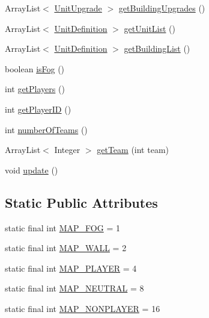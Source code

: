 \begin{DoxyCompactItemize}
ArrayList$<$ \hyperlink{classrts_1_1units_1_1_unit_upgrade}{UnitUpgrade} $>$ \hyperlink{classrts_1_1_game_state_a03f3ea2f7b2adb753694640ac39bc137}{getBuildingUpgrades} ()
\item 
ArrayList$<$ \hyperlink{classrts_1_1units_1_1_unit_definition}{UnitDefinition} $>$ \hyperlink{classrts_1_1_game_state_a747a9b452f6f523b111b5514688371dd}{getUnitList} ()
\item 
ArrayList$<$ \hyperlink{classrts_1_1units_1_1_unit_definition}{UnitDefinition} $>$ \hyperlink{classrts_1_1_game_state_a399feef9dac8584ae6e7480ecb573fb3}{getBuildingList} ()
\item 
boolean \hyperlink{classrts_1_1_game_state_ae7a0a1ef1bf0da51698ae5b9b572c4aa}{isFog} ()
\item 
int \hyperlink{classrts_1_1_game_state_afce4924a2e0cfc3dec27d36fe7f7eb57}{getPlayers} ()
\item 
int \hyperlink{classrts_1_1_game_state_a7ddc9862d7e3f2e0769f36bca696c094}{getPlayerID} ()
\item 
int \hyperlink{classrts_1_1_game_state_a81b78fd1308e71be6ba2c380280f3b69}{numberOfTeams} ()
\item 
ArrayList$<$ Integer $>$ \hyperlink{classrts_1_1_game_state_a0ffd9ba27b729ac65d48db250b73590d}{getTeam} (int team)
\item 
void \hyperlink{classrts_1_1_game_state_a24d74971777021954b07e350e931eb0d}{update} ()
\end{DoxyCompactItemize}
\subsection*{Static Public Attributes}
\begin{DoxyCompactItemize}
\item 
static final int \hyperlink{classrts_1_1_game_state_a530c303576be610b056108a2f8170aab}{MAP\_\-FOG} = 1
\item 
static final int \hyperlink{classrts_1_1_game_state_a439d94001bcac138eb445a25b389f3ed}{MAP\_\-WALL} = 2
\item 
static final int \hyperlink{classrts_1_1_game_state_a409da5852f5fbcb2bd2bdce1bfed6ecd}{MAP\_\-PLAYER} = 4
\item 
static final int \hyperlink{classrts_1_1_game_state_a91ca0cc55905241db9813413990ce41b}{MAP\_\-NEUTRAL} = 8
\item 
static final int \hyperlink{classrts_1_1_game_state_ad8c202b6a846602677feafec3a508a37}{MAP\_\-NONPLAYER} = 16
\end{DoxyCompactItemize}
